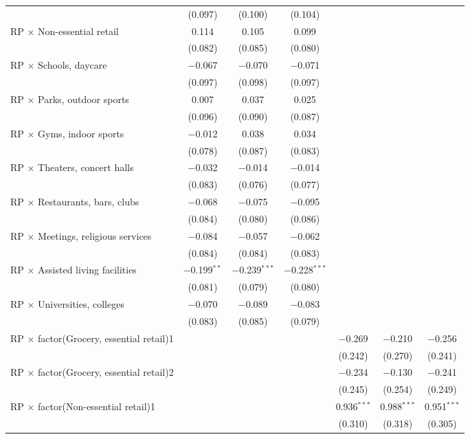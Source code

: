 \begin{table}[!htbp]
\begin{tabular}{@{\extracolsep{5pt}}lcccccc}
  & (0.097) & (0.100) & (0.104) &  &  &  \\ 
  RP $\times$ Non-essential retail & 0.114 & 0.105 & 0.099 &  &  &  \\ 
  & (0.082) & (0.085) & (0.080) &  &  &  \\ 
  RP $\times$ Schools, daycare & $-$0.067 & $-$0.070 & $-$0.071 &  &  &  \\ 
  & (0.097) & (0.098) & (0.097) &  &  &  \\ 
  RP $\times$ Parks, outdoor sports & 0.007 & 0.037 & 0.025 &  &  &  \\ 
  & (0.096) & (0.090) & (0.087) &  &  &  \\ 
  RP $\times$ Gyms, indoor sports & $-$0.012 & 0.038 & 0.034 &  &  &  \\ 
  & (0.078) & (0.087) & (0.083) &  &  &  \\ 
  RP $\times$ Theaters, concert halls & $-$0.032 & $-$0.014 & $-$0.014 &  &  &  \\ 
  & (0.083) & (0.076) & (0.077) &  &  &  \\ 
  RP $\times$ Restaurants, bars, clubs & $-$0.068 & $-$0.075 & $-$0.095 &  &  &  \\ 
  & (0.084) & (0.080) & (0.086) &  &  &  \\ 
  RP $\times$ Meetings, religious services & $-$0.084 & $-$0.057 & $-$0.062 &  &  &  \\ 
  & (0.084) & (0.084) & (0.083) &  &  &  \\ 
  RP $\times$ Assisted living facilities & $-$0.199$^{**}$ & $-$0.239$^{***}$ & $-$0.228$^{***}$ &  &  &  \\ 
  & (0.081) & (0.079) & (0.080) &  &  &  \\ 
  RP $\times$ Universities, colleges & $-$0.070 & $-$0.089 & $-$0.083 &  &  &  \\ 
  & (0.083) & (0.085) & (0.079) &  &  &  \\ 
  RP $\times$ factor(Grocery, essential retail)1 &  &  &  & $-$0.269 & $-$0.210 & $-$0.256 \\ 
  &  &  &  & (0.242) & (0.270) & (0.241) \\ 
  RP $\times$ factor(Grocery, essential retail)2 &  &  &  & $-$0.234 & $-$0.130 & $-$0.241 \\ 
  &  &  &  & (0.245) & (0.254) & (0.249) \\ 
  RP $\times$ factor(Non-essential retail)1 &  &  &  & 0.936$^{***}$ & 0.988$^{***}$ & 0.951$^{***}$ \\ 
  &  &  &  & (0.310) & (0.318) & (0.305) \\ 

\end{tabular}
\end{table}
